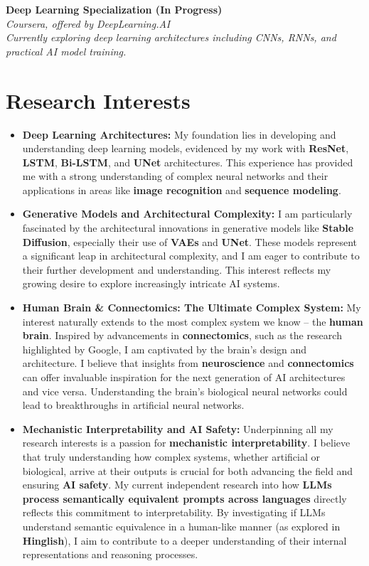 \documentclass[10pt, letterpaper]{article}
\begin{document}
\textbf{Deep Learning Specialization (In Progress)} \\
\textit{Coursera, offered by DeepLearning.AI} \\
\textit{Currently exploring deep learning architectures including CNNs, RNNs, and practical AI model training.}

\section{Research Interests}
\begin{itemize}
    \item \textbf{Deep Learning Architectures:} My foundation lies in developing and understanding deep learning models, evidenced by my work with \textbf{ResNet}, \textbf{LSTM}, \textbf{Bi-LSTM}, and \textbf{UNet} architectures. This experience has provided me with a strong understanding of complex neural networks and their applications in areas like \textbf{image recognition} and \textbf{sequence modeling}.
    \item \textbf{Generative Models and Architectural Complexity:} I am particularly fascinated by the architectural innovations in generative models like \textbf{Stable Diffusion}, especially their use of \textbf{VAEs} and \textbf{UNet}. These models represent a significant leap in architectural complexity, and I am eager to contribute to their further development and understanding. This interest reflects my growing desire to explore increasingly intricate AI systems.
    \item \textbf{Human Brain \& Connectomics: The Ultimate Complex System:} My interest naturally extends to the most complex system we know – the \textbf{human brain}. Inspired by advancements in \textbf{connectomics}, such as the research highlighted by Google, I am captivated by the brain's design and architecture. I believe that insights from \textbf{neuroscience} and \textbf{connectomics} can offer invaluable inspiration for the next generation of AI architectures and vice versa. Understanding the brain's biological neural networks could lead to breakthroughs in artificial neural networks.
    \item \textbf{Mechanistic Interpretability and AI Safety:} Underpinning all my research interests is a passion for \textbf{mechanistic interpretability}. I believe that truly understanding how complex systems, whether artificial or biological, arrive at their outputs is crucial for both advancing the field and ensuring \textbf{AI safety}. My current independent research into how \textbf{LLMs process semantically equivalent prompts across languages} directly reflects this commitment to interpretability. By investigating if LLMs understand semantic equivalence in a human-like manner (as explored in \textbf{Hinglish}), I aim to contribute to a deeper understanding of their internal representations and reasoning processes.
\end{itemize}
\end{document}
